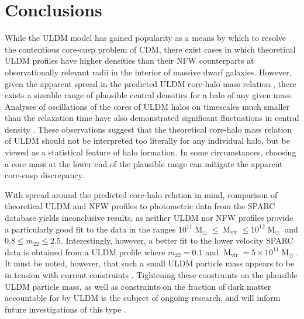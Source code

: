 \documentclass[a4paper,11pt]{article}
\begin{document}
\section{Conclusions}\label{sec:conclusion}

While the ULDM model has gained popularity as a means by which to resolve the contentious core-cusp problem of CDM, there exist cases in which theoretical ULDM profiles have higher densities than their NFW counterparts at observationally relevant radii in the interior of massive dwarf galaxies. However, given the apparent spread in the predicted ULDM core-halo mass relation \cite{Schive:2014hza}, there exists a sizeable range of plausible central densities for a halo of any given mass. Analyses of oscillations of the cores of ULDM halos on timescales much smaller than the relaxation time have also demonstrated significant fluctuations in central density \cite{Veltmaat:2018dfz}. These observations suggest that the theoretical core-halo mass relation of ULDM should not be interpreted too literally for any individual halo, but be viewed as a statistical feature of halo formation. In some circumstances, choosing a core mass at the lower end of the plausible range can mitigate the apparent core-cusp discrepancy. 

With spread around the predicted core-halo relation in mind, comparison of theoretical ULDM and NFW profiles to photometric data from the SPARC database yields inconclusive results, as neither ULDM nor NFW profiles provide a particularly good fit to the data in the ranges $10^{11}\operatorname{M}_{\odot}\leq \operatorname{M}_{\mathrm{vir}} \leq 10^{12}\operatorname{M}_{\odot}$ and $0.8 \leq m_{22} \leq 2.5$. Interestingly, however, a better fit to the lower velocity SPARC data is obtained from a ULDM profile where $m_{22} = 0.1$ and $\operatorname{M}_{\mathrm{vir}} = 5\times 10^{11}\operatorname{M}_{\odot}$. It must be noted, however, that such a small ULDM particle mass appears to be in tension with current constraints \cite{Amendola:2005ad, Bozek:2014uqa, Armengaud:2017nkf, Ni:2019qfa, Nebrin:2018vqt}. Tightening these constraints on the plausible ULDM particle mass, as well as constraints on the fraction of dark matter accountable for by ULDM is the subject of ongoing research, and will inform future investigations of this type \cite{Castellano:2019hdd, Lidz:2018fqo, Davoudiasl:2019nlo}.
\end{document}
